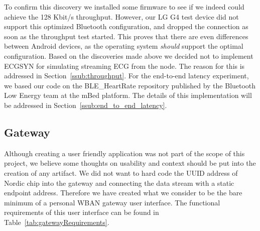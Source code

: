 To confirm this discovery we installed some firmware \cite{nordic:throughputtest} to see if we indeed could achieve the 128 Kbit/s throughput. However, our LG G4 test device did not support this optimized Bluetooth configuration, and dropped the connection as soon as the throughput test started. This proves that there are even differences between Android devices, as the operating system \emph{should} support the optimal configuration. Based on the discoveries made above we decided not to implement ECGSYN for simulating streaming ECG from the node. The reason for this is addressed in Section~\ref{ssub:throughput}. For the end-to-end latency experiment, we based our code on the BLE\_HeartRate repository \cite{mbed:bleheartrate} published by the Bluetooth Low Energy team at the mBed platform. The details of this implementation will be addressed in Section~\ref{ssub:end_to_end_latency}.


\subsection{Gateway} %
\label{sub:gateway}


Although creating a user friendly application was not part of the scope of this project, we believe some thoughts on usability and context should be put into the creation of any artifact. We did not want to hard code the UUID address of Nordic chip into the gateway and connecting the data stream with a static endpoint address. Therefore we have created what we consider to be the bare minimum of a personal WBAN gateway user interface. The functional requirements of this user interface can be found in Table~\ref{tab:gatewayRequirements}.

